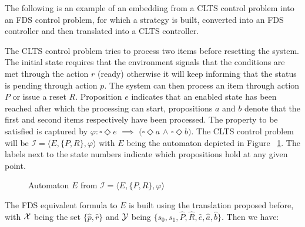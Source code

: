 The following is an example of an embedding from a CLTS control problem into an FDS control problem, for which a strategy is built, converted into an FDS controller and then translated into a CLTS controller. 

The CLTS control problem tries to process two items before resetting the system. The initial state requires that the environment signals that the conditions are met through the action $r$ (ready) otherwise it will keep informing that the status is pending through action $p$.  The system can then process an item through action $P$ or issue a reset $R$. Proposition $e$ indicates that an enabled state has been reached after which the processing can start, propositions $a$ and $b$ denote that the first and second items respectively have been processed. 
The property to be satisfied is captured by $\varphi: \square \Diamond e$ $\implies$ $(\square \Diamond a$ $\wedge$ $\square \Diamond b)$. The CLTS control problem will be $\mathcal{I}=\langle E, \{P,R\}, \varphi \rangle$ with $E$ being the automaton depicted in Figure ~\ref{fig:clts_to_fds_E}. The labels next to the state numbers indicate which propositions hold at any given point.

\begin{figure}[bt]
	\centering
	\caption{Automaton $E$ from $\mathcal{I}=\langle E, \{P,R\}, \varphi \rangle$}
	\label{fig:clts_to_fds_E}
\end{figure}

The FDS equivalent formula to $E$ is built using the translation proposed before, with ${\mathcal{X}}$ being the set $\{\hat{p},\hat{r}\}$ and ${\mathcal{Y}}$ being $\{s_0,s_1,\hat{P},\hat{R},\hat{e},\hat{a},\hat{b}\}$. Then we have:

